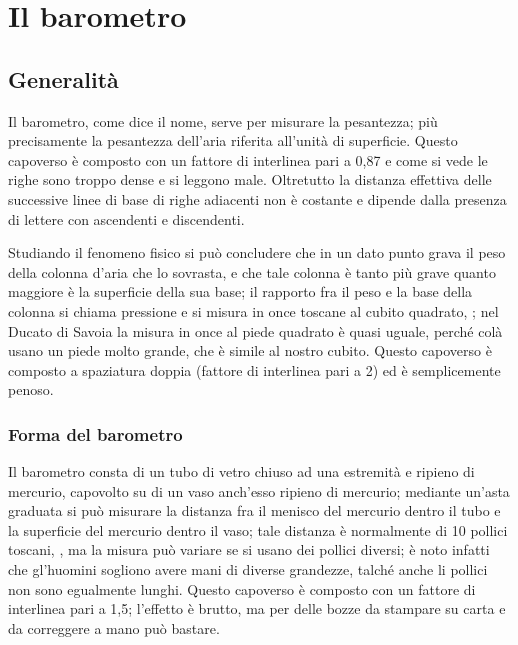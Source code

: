 \documentclass[%
corpo=12pt,
twoside,
tipotesi=magistrale,
]{toptesi}
\begin{document}
\chapter{Il barometro}
\section{Generalità}
\begin{interlinea}{0.87} Il barometro, come dice il nome, serve per
misurare la pesantezza; più precisamente la pesantezza dell'aria
riferita all'unità di superficie. Questo capoverso è composto con un fattore di interlinea pari a 0,87 e come si vede le righe sono troppo dense e si leggono male. Oltretutto la distanza effettiva delle successive linee di base di righe adiacenti non è costante e dipende dalla presenza di lettere con ascendenti e discendenti.
\end{interlinea}

\begin{interlinea}{2} Studiando il fenomeno fisico si può concludere
che in un dato punto grava il peso della colonna d'aria che lo
sovrasta, e che tale colonna è tanto più grave quanto maggiore
è la superficie della sua base; il rapporto fra il peso e la base
della colonna si chiama pressione e si misura in once toscane al cubito
quadrato, \cite{tor1}; nel Ducato di Savoia la misura in once al piede
quadrato è quasi uguale, perché colà usano un piede molto
grande, che è simile al nostro cubito. Questo capoverso è composto a spaziatura doppia (fattore di interlinea pari a 2) ed è semplicemente penoso.
\end{interlinea}

\subsection{Forma del barometro}

\begin{interlinea}{1.5}
Il barometro consta di un tubo di vetro chiuso ad una estremità e
ripieno di mercurio, capovolto su di un vaso anch'esso ripieno di
mercurio; mediante un'asta graduata si può misurare la distanza fra
il menisco del mercurio dentro il tubo e la superficie del mercurio
dentro il vaso; tale distanza è normalmente di 10 pollici toscani,
\cite{tor1,tor2}, ma la misura può variare se si usano dei pollici
diversi; è noto infatti che gl'huomini sogliono avere mani di
diverse grandezze, talché anche li pollici non sono egualmente
lunghi. Questo capoverso è composto con un fattore di interlinea pari a 1,5; l'effetto è brutto, ma per delle bozze da stampare su carta e da correggere a mano può bastare.
\end{interlinea}
\end{document}
